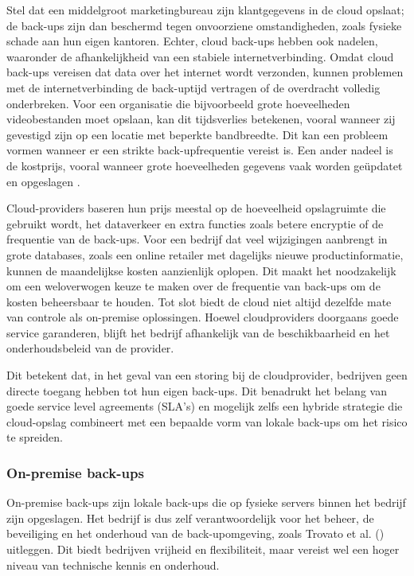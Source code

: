 Stel dat een middelgroot marketingbureau zijn klantgegevens in de cloud opslaat; de back-ups zijn dan beschermd tegen onvoorziene omstandigheden, zoals fysieke schade aan hun eigen kantoren. Echter, cloud back-ups hebben ook nadelen, waaronder de afhankelijkheid van een stabiele internetverbinding. Omdat cloud back-ups vereisen dat data over het internet wordt verzonden, kunnen problemen met de internetverbinding de back-uptijd vertragen of de overdracht volledig onderbreken. Voor een organisatie die bijvoorbeeld grote hoeveelheden videobestanden moet opslaan, kan dit tijdsverlies betekenen, vooral wanneer zij gevestigd zijn op een locatie met beperkte bandbreedte. Dit kan een probleem vormen wanneer er een strikte back-upfrequentie vereist is. Een ander nadeel is de kostprijs, vooral wanneer grote hoeveelheden gegevens vaak worden geüpdatet en opgeslagen \autocite{Obrutsky2016}. 

Cloud-providers baseren hun prijs meestal op de hoeveelheid opslagruimte die gebruikt wordt, het dataverkeer en extra functies zoals betere encryptie of de frequentie van de back-ups. Voor een bedrijf dat veel wijzigingen aanbrengt in grote databases, zoals een online retailer met dagelijks nieuwe productinformatie, kunnen de maandelijkse kosten aanzienlijk oplopen. Dit maakt het noodzakelijk om een weloverwogen keuze te maken over de frequentie van back-ups om de kosten beheersbaar te houden. Tot slot biedt de cloud niet altijd dezelfde mate van controle als on-premise oplossingen. Hoewel cloudproviders doorgaans goede service garanderen, blijft het bedrijf afhankelijk van de beschikbaarheid en het onderhoudsbeleid van de provider. 

Dit betekent dat, in het geval van een storing bij de cloudprovider, bedrijven geen directe toegang hebben tot hun eigen back-ups. Dit benadrukt het belang van goede service level agreements (SLA's) en mogelijk zelfs een hybride strategie die cloud-opslag combineert met een bepaalde vorm van lokale back-ups om het risico te spreiden.

\subsubsection{On-premise back-ups}
On-premise back-ups zijn lokale back-ups die op fysieke servers binnen het bedrijf zijn opgeslagen. Het bedrijf is dus zelf verantwoordelijk voor het beheer, de beveiliging en het onderhoud van de back-upomgeving, zoals Trovato et al. (\citeyear{Trovato2019}) uitleggen. Dit biedt bedrijven vrijheid en flexibiliteit, maar vereist wel een hoger niveau van technische kennis en onderhoud. 

